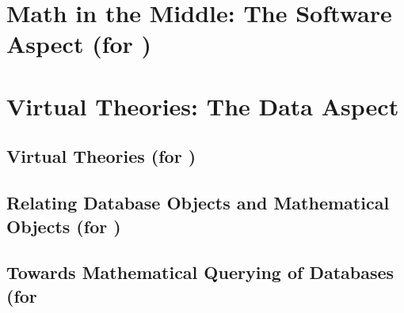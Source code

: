 \documentclass{deliverablereport}
\begin{document}
\newpage
\section{Math in the Middle: The Software Aspect (for )}\label{sec:mitm}


\newpage
\section{Virtual Theories: The Data Aspect}\label{sec:data}
\subsection{Virtual Theories  (for )}\label{sec:virtual}

\subsection{Relating Database Objects and Mathematical Objects  (for )}\label{sec:codec}

\subsection{Towards Mathematical Querying of Databases (for }\label{sec:querying}





\newpage\printbibliography

\begin{appendix}

\end{appendix}
\end{document}
